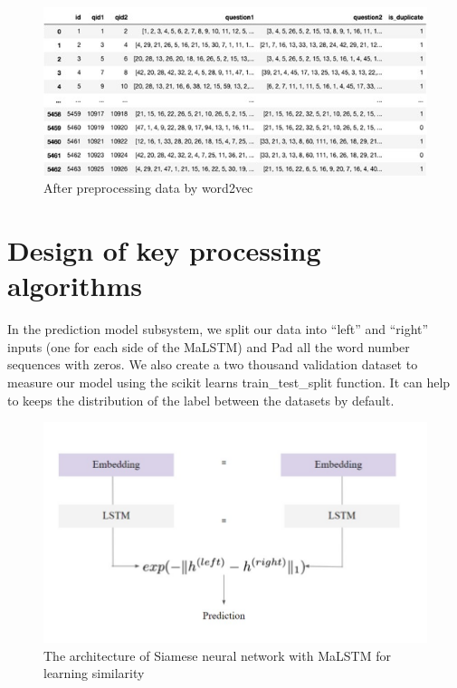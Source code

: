 \documentclass[12pt,oneside,openright,a4paper]{cpe-english-project}
\begin{document}
\begin{figure}[!h]
	\includegraphics[width=14cm]{img/ch3/After preprocessing data by word2vec.jpg}
	\caption{After preprocessing data by word2vec}\label{fig:After preprocessing data by word2vec}
\end{figure}

\section{Design of key processing algorithms}
\begin{flushleft}
In the prediction model subsystem, we split our data into “left” and “right” inputs (one for each side of the MaLSTM) and Pad all the word number sequences with zeros. We also create a two thousand validation dataset to measure our model using the scikit learns train\_test\_split function. It can help to keeps the distribution of the label between the datasets by default.
\end{flushleft}

\pagebreak

\begin{figure}[!h]
	\includegraphics[width=14cm]{img/ch3/The architecture of Siamese neural network with MaLSTM for learning similarity.jpg}
	\caption{The architecture of Siamese neural network with MaLSTM for learning similarity}\label{fig:The architecture of Siamese neural network with MaLSTM for learning similarity}
\end{figure}
\end{document}
